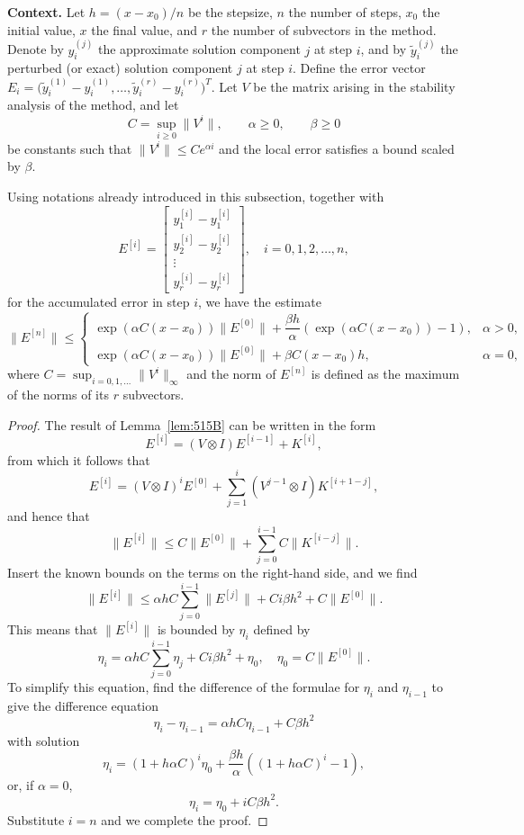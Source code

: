 \noindent\textbf{Context.}
Let $h = (x - x_0)/n$ be the stepsize, $n$ the number of steps, $x_0$ the initial value, $x$ the final value, and $r$ the number of subvectors in the method.  
Denote by $y_{i}^{(j)}$ the approximate solution component $j$ at step $i$, and by $\tilde{y}_{i}^{(j)}$ the perturbed (or exact) solution component $j$ at step $i$.  
Define the error vector $E_i = \bigl( \tilde{y}_{i}^{(1)} - y_{i}^{(1)},\dots, \tilde{y}_{i}^{(r)} - y_{i}^{(r)} \bigr)^T$.  
Let $V$ be the matrix arising in the stability analysis of the method, and let  
\[
C = \sup_{i\ge 0} \|V^i\|, \qquad \alpha \ge 0, \qquad \beta \ge 0
\]
be constants such that $\|V^i\| \le C e^{\alpha i}$ and the local error satisfies a bound scaled by $\beta$.

\begin{lemma}

  \label{lem:515C}
Using notations already introduced in this subsection, together with
\[
E^{[i]} = \begin{bmatrix}
y_1^{[i]} - y_1^{[i]} \\
y_2^{[i]} - y_2^{[i]} \\
\vdots \\
y_r^{[i]} - y_r^{[i]}
\end{bmatrix}, \quad i = 0, 1, 2, \dots, n,
\]
for the accumulated error in step $i$, we have the estimate
\[
\|E^{[n]}\| \leq 
\begin{cases}
\exp(\alpha C(x - x_0)) \|E^{[0]}\| + \dfrac{\beta h}{\alpha} (\exp(\alpha C(x - x_0)) - 1), & \alpha > 0, \\
\exp(\alpha C(x - x_0)) \|E^{[0]}\| + \beta C(x - x_0) h, & \alpha = 0,
\end{cases}
\]
where $C = \sup_{i=0,1,\dots} \|V^i\|_\infty$ and the norm of $E^{[n]}$ is defined as the maximum of the norms of its $r$ subvectors.
\end{lemma}

\begin{proof}
The result of Lemma~\ref{lem:515B} can be written in the form
\[
E^{[i]} = (V \otimes I)E^{[i-1]} + K^{[i]},
\]
from which it follows that
\[
E^{[i]} = (V \otimes I)^i E^{[0]} + \sum_{j=1}^{i} (V^{j-1} \otimes I)K^{[i+1-j]},
\]
and hence that
\[
\|E^{[i]}\| \leq C \|E^{[0]}\| + \sum_{j=0}^{i-1} C \|K^{[i-j]}\|.
\]
Insert the known bounds on the terms on the right-hand side, and we find
\[
\|E^{[i]}\| \leq \alpha h C \sum_{j=0}^{i-1} \|E^{[j]}\| + C i \beta h^2 + C \|E^{[0]}\|.
\]
This means that $\|E^{[i]}\|$ is bounded by $\eta_i$ defined by
\[
\eta_i = \alpha h C \sum_{j=0}^{i-1} \eta_j + C i \beta h^2 + \eta_0, \quad \eta_0 = C \|E^{[0]}\|.
\]
To simplify this equation, find the difference of the formulae for $\eta_i$ and $\eta_{i-1}$ to give the difference equation
\[
\eta_i - \eta_{i-1} = \alpha h C \eta_{i-1} + C \beta h^2
\]
with solution
\[
\eta_i = (1 + h \alpha C)^i \eta_0 + \frac{\beta h}{\alpha} ((1 + h \alpha C)^i - 1),
\]
or, if $\alpha = 0$,
\[
\eta_i = \eta_0 + i C \beta h^2.
\]
Substitute $i = n$ and we complete the proof.
\end{proof}

